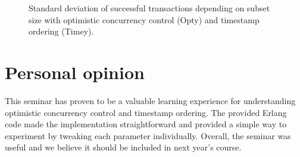 \documentclass[a4paper, 10pt]{article}
\begin{document}
\begin{figure}[htp]
\begin{center}
\caption{Standard deviation of successful transactions depending on subset size with optimistic concurrency control (Opty) and timestamp ordering (Timey).}
\label{fig:tstdv}
\end{center}
\end{figure}

\newpage

\section{Personal opinion}


This seminar has proven to be a valuable learning experience for understanding optimistic concurrency control and timestamp ordering.
The provided Erlang code made the implementation straightforward and provided a simple way to experiment by tweaking each parameter individually. 
Overall, the seminar was useful and we believe it should be included in next year's course.
\end{document}
